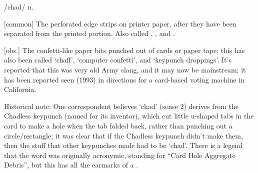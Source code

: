  /chad/ n.

\begin{inparaenum}
\item {[}common] The perforated edge strips on printer paper, after they have
    been separated from the printed portion. Also called ,
    , and .
\item {[}obs.] The
    confetti-like paper bits punched out of cards or paper tape; this has also
    been called `chaff', `computer confetti', and `keypunch droppings'. It's
    reported that this was very old Army slang, and it may now be mainstream; it
    has been reported seen (1993) in directions for a card-based voting machine
    in California.
\end{inparaenum}

Historical note: One correspondent believes `chad' (sense 2) derives from the
Chadless keypunch (named for its inventor), which cut little u-shaped tabs in
the card to make a hole when the tab folded back, rather than punching out a
circle/rectangle; it was clear that if the Chadless keypunch didn't make them,
then the stuff that other keypunches made had to be `chad'. There is a legend
that the word was originally acronymic, standing for ``Card Hole Aggregate
Debris'', but this has all the earmarks of a .

